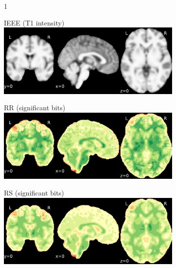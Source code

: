 \documentclass{article}
\begin{document}
\begin{landscape}
    \begin{figure}

        \vspace*{-2cm}
        \centering
        \begin{subfigure}[b][][c]{0.01\paperwidth} 1 \vspace*{-45pt} \end{subfigure}
        \begin{subfigure}[t]{0.16\paperheight}
            \centering
            IEEE (T1 intensity)
            \includegraphics[width=\textwidth]{figures/ieee_T1/fwhm_5/ieee_ds001600_sub-1.pdf}
        \end{subfigure}
        \begin{subfigure}[t]{0.16\paperheight}
            \centering
            RR (significant bits)
            \includegraphics[width=\textwidth]{figures/sig/fwhm_5/rr_ds001600_sub-1_sig.pdf}
        \end{subfigure}
        \begin{subfigure}[t]{0.16\paperheight}
            \centering
            RS (significant bits)
            \includegraphics[width=\textwidth]{figures/sig/fwhm_5/rs_ds001600_sub-1_sig.pdf}

\end{subfigure}
\end{figure}
\end{landscape}
\end{document}
